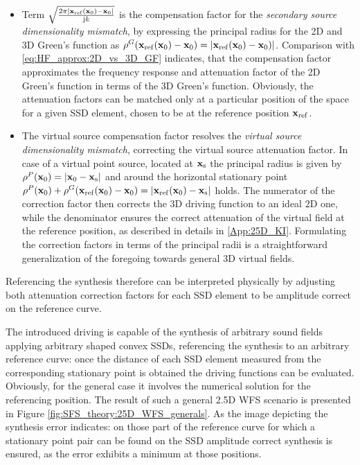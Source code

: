 \begin{itemize}
\item Term $\sqrt{\frac{ 2\pi |\mathbf{x}_{\mathrm{ref}}(\mathbf{x}_0)-\mathbf{x}_0| }{ \mathrm{j} k }}$ is the compensation factor for the \emph{secondary source dimensionality mismatch}, by expressing the principal radius for the 2D and 3D Green's function as $\rho^G(\mathbf{x}_{\mathrm{ref}}(\mathbf{x}_0)-\mathbf{x}_0) = |\mathbf{x}_{\mathrm{ref}}(\mathbf{x}_0)-\mathbf{x}_0)|$.
	Comparison with \eqref{eq:HF_approx:2D_vs_3D_GF} indicates, that the compensation factor approximates the frequency response and attenuation factor of the 2D Green's function in terms of the 3D Green's function.
	Obviously, the attenuation factors can be matched only at a particular position of the space for a given SSD element, chosen to be at the reference position $\mathbf{x}_{\mathrm{ref}}$.
%
\item The virtual source compensation factor resolves the \emph{virtual source dimensionality mismatch}, correcting the virtual source attenuation factor.
In case of a virtual point source, located at $\mathbf{x}_{\mathrm{s}}$ the principal radius is given by $\rho^P(\mathbf{x}_0)=|\mathbf{x}_0-\mathbf{x}_{\mathrm{s}}|$ and around the horizontal stationary point $\rho^P(\mathbf{x}_0) +  \rho^G(\mathbf{x}_{\mathrm{ref}}(\mathbf{x}_0)-\mathbf{x}_0) = |\mathbf{x}_{\mathrm{ref}}(\mathbf{x}_0)-\mathbf{x}_{\mathrm{s}}|$ holds.
The numerator of the correction factor then corrects the 3D driving function to an ideal 2D one, while the denominator ensures the correct attenuation of the virtual field at the reference position, as described in details in \ref{App:25D_KI}.
Formulating the correction factors in terms of the principal radii is a straightforward generalization of the foregoing towards general 3D virtual fields.
\end{itemize}
Referencing the synthesis therefore can be interpreted physically by adjusting both attenuation correction factors for each SSD element to be amplitude correct on the reference curve.

\vspace{3mm}
The introduced driving is capable of the synthesis of arbitrary sound fields applying arbitrary shaped convex SSDs, referencing the synthesis to an arbitrary reference curve:
once the distance of each SSD element measured from the corresponding stationary point is obtained the driving functions can be evaluated.
Obviously, for the general case it involves the numerical solution for the referencing position.
The result of such a general 2.5D WFS scenario is presented in Figure \ref{fig:SFS_theory:25D_WFS_generals}.
As the image depicting the synthesis error indicates: on those part of the reference curve for which a stationary point pair can be found on the SSD amplitude correct synthesis is ensured, as the error exhibits a minimum at those positions.
%

